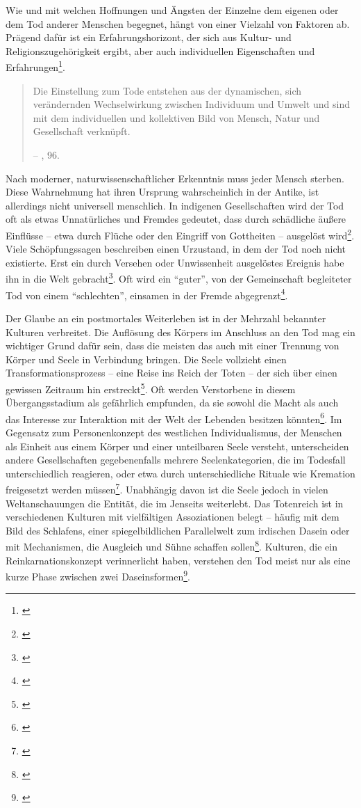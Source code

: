 \documentclass[openany,twoside,twocolumn]{book}
\let\rmarkdownfootnote\footnote%
\def\footnote{\protect\rmarkdownfootnote}
\begin{document}
Wie und mit welchen Hoffnungen und Ängsten der Einzelne dem eigenen oder dem Tod anderer Menschen begegnet, hängt von einer Vielzahl von Faktoren ab. Prägend dafür ist ein Erfahrungshorizont, der sich aus Kultur- und Religionszugehörigkeit ergibt, aber auch individuellen Eigenschaften und Erfahrungen\footnote{\textcite{mischke_umgang_1996}}.

\begin{quote}
Die Einstellung zum Tode entstehen aus der dynamischen, sich verändernden Wechselwirkung zwischen Individuum und Umwelt und sind mit dem individuellen und kollektiven Bild von Mensch, Natur und Gesellschaft verknüpft.

-- \textcite{hofmann_rituelle_2008}, 96.
\end{quote}

Nach moderner, naturwissenschaftlicher Erkenntnis muss jeder Mensch sterben. Diese Wahrnehmung hat ihren Ursprung wahrscheinlich in der Antike, ist allerdings nicht universell menschlich. In indigenen Gesellschaften wird der Tod oft als etwas Unnatürliches und Fremdes gedeutet, dass durch schädliche äußere Einflüsse -- etwa durch Flüche oder den Eingriff von Gottheiten -- ausgelöst wird\footnote{\textcite{condrau_mensch_1991}}. Viele Schöpfungssagen beschreiben einen Urzustand, in dem der Tod noch nicht existierte. Erst ein durch Versehen oder Unwissenheit ausgelöstes Ereignis habe ihn in die Welt gebracht\footnote{\textcite{weis_zur_1986}}. Oft wird ein ``guter'', von der Gemeinschaft begleiteter Tod von einem ``schlechten'', einsamen in der Fremde abgegrenzt\footnote{\textcite{bradbury_representations_1996}}.

Der Glaube an ein postmortales Weiterleben ist in der Mehrzahl bekannter Kulturen verbreitet. Die Auflösung des Körpers im Anschluss an den Tod mag ein wichtiger Grund dafür sein, dass die meisten das auch mit einer Trennung von Körper und Seele in Verbindung bringen. Die Seele vollzieht einen Transformationsprozess -- eine Reise ins Reich der Toten -- der sich über einen gewissen Zeitraum hin erstreckt\footnote{\textcite{weis_zur_1986}}. Oft werden Verstorbene in diesem Übergangsstadium als gefährlich empfunden, da sie sowohl die Macht als auch das Interesse zur Interaktion mit der Welt der Lebenden besitzen könnten\footnote{\textcite{drubig_geschichte_1994}}. Im Gegensatz zum Personenkonzept des westlichen Individualismus, der Menschen als Einheit aus einem Körper und einer unteilbaren Seele versteht, unterscheiden andere Gesellschaften gegebenenfalls mehrere Seelenkategorien, die im Todesfall unterschiedlich reagieren, oder etwa durch unterschiedliche Rituale wie Kremation freigesetzt werden müssen\footnote{\textcite{graslund_prehistoric_1994}}. Unabhängig davon ist die Seele jedoch in vielen Weltanschauungen die Entität, die im Jenseits weiterlebt. Das Totenreich ist in verschiedenen Kulturen mit vielfältigen Assoziationen belegt -- häufig mit dem Bild des Schlafens, einer spiegelbildlichen Parallelwelt zum irdischen Dasein oder mit Mechanismen, die Ausgleich und Sühne schaffen sollen\footnote{\textcite{stubbe_trauerverhalten_1988}}. Kulturen, die ein Reinkarnationskonzept verinnerlicht haben, verstehen den Tod meist nur als eine kurze Phase zwischen zwei Daseinsformen\footnote{\textcite{payer_stichwort_1998}}.
\end{document}
